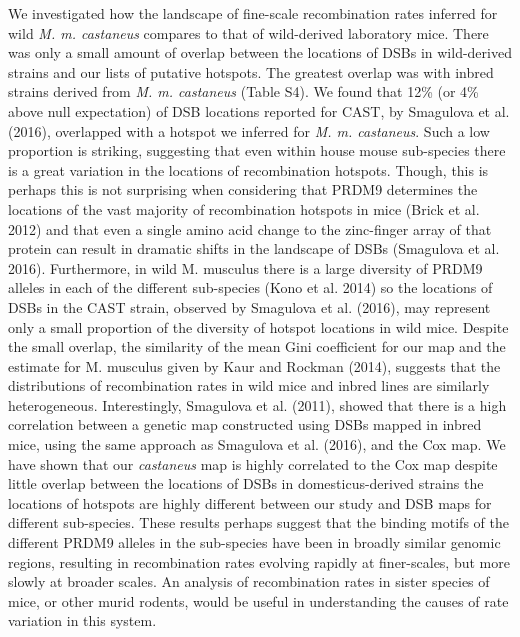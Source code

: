 We investigated how the landscape of fine-scale recombination rates inferred for wild \emph{M. m. castaneus} compares to that of wild-derived laboratory mice. There was only a small amount of overlap between the locations of DSBs in wild-derived strains and our lists of putative hotspots. The greatest overlap was with inbred strains derived from \emph{M. m. castaneus} (Table S4). We found that 12\% (or 4\% above null expectation) of DSB locations reported for CAST, by Smagulova et al. (2016), overlapped with a hotspot we inferred for \emph{M. m. castaneus}. Such a low proportion is striking, suggesting that even within house mouse sub-species there is a great variation in the locations of recombination hotspots. Though, this is perhaps this is not surprising when considering that PRDM9 determines the locations of the vast majority of recombination hotspots in mice (Brick et al. 2012) and that even a single amino acid change to the zinc-finger array of that protein can result in dramatic shifts in the landscape of DSBs (Smagulova et al. 2016). Furthermore, in wild M. musculus there is a large diversity of PRDM9 alleles in each of the different sub-species (Kono et al. 2014) so the locations of DSBs in the CAST strain, observed by Smagulova et al. (2016), may represent only a small proportion of the diversity of hotspot locations in wild mice. Despite the small overlap, the similarity of the mean Gini coefficient for our map and the estimate for M. musculus given by Kaur and Rockman (2014), suggests that the distributions of recombination rates in wild mice and inbred lines are similarly heterogeneous. Interestingly, Smagulova et al. (2011), showed that there is a high correlation between a genetic map constructed using DSBs mapped in inbred mice, using the same approach as Smagulova et al. (2016), and the Cox map. We have shown that our \textit{castaneus} map is highly correlated to the Cox map despite little overlap between the locations of DSBs in domesticus-derived strains the locations of hotspots are highly different between our study and DSB maps for different sub-species. These results perhaps suggest that the binding motifs of the different PRDM9 alleles in the sub-species have been in broadly similar genomic regions, resulting in recombination rates evolving rapidly at finer-scales, but more slowly at broader scales. An analysis of recombination rates in sister species of mice, or other murid rodents, would be useful in understanding the causes of rate variation in this system.

